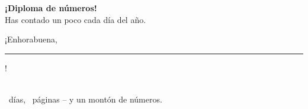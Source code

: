 \begin{center}
\vspace*{3cm}

\medalla{\totaldias}

\vspace{8mm}
{\fontsize{34}{40}\selectfont\bfseries\color{colorLectura} ¡Diploma de números!}\\[8mm]
{\Large Has contado un poco cada día del año.}\\[10mm]
{\Large ¡Enhorabuena, \rule{65mm}{0.4pt}!}\\[14mm]
{\large \totaldias\ días, \totaldias\ páginas -- y un montón de números.}
\end{center}
\vspace*{\fill}
\newpage
